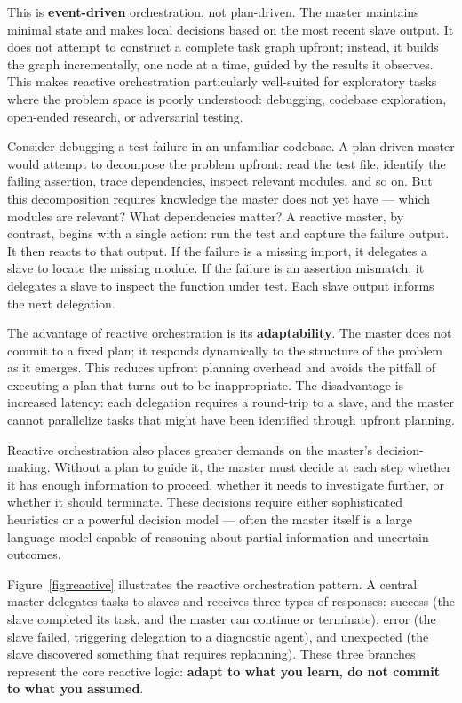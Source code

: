 This is \textbf{event-driven} orchestration, not plan-driven. The master maintains minimal state and makes local decisions based on the most recent slave output. It does not attempt to construct a complete task graph upfront; instead, it builds the graph incrementally, one node at a time, guided by the results it observes. This makes reactive orchestration particularly well-suited for exploratory tasks where the problem space is poorly understood: debugging, codebase exploration, open-ended research, or adversarial testing.

Consider debugging a test failure in an unfamiliar codebase. A plan-driven master would attempt to decompose the problem upfront: read the test file, identify the failing assertion, trace dependencies, inspect relevant modules, and so on. But this decomposition requires knowledge the master does not yet have — which modules are relevant? What dependencies matter? A reactive master, by contrast, begins with a single action: run the test and capture the failure output. It then reacts to that output. If the failure is a missing import, it delegates a slave to locate the missing module. If the failure is an assertion mismatch, it delegates a slave to inspect the function under test. Each slave output informs the next delegation.

The advantage of reactive orchestration is its \textbf{adaptability}. The master does not commit to a fixed plan; it responds dynamically to the structure of the problem as it emerges. This reduces upfront planning overhead and avoids the pitfall of executing a plan that turns out to be inappropriate. The disadvantage is increased latency: each delegation requires a round-trip to a slave, and the master cannot parallelize tasks that might have been identified through upfront planning.

Reactive orchestration also places greater demands on the master's decision-making. Without a plan to guide it, the master must decide at each step whether it has enough information to proceed, whether it needs to investigate further, or whether it should terminate. These decisions require either sophisticated heuristics or a powerful decision model — often the master itself is a large language model capable of reasoning about partial information and uncertain outcomes.

Figure~\ref{fig:reactive} illustrates the reactive orchestration pattern. A central master delegates tasks to slaves and receives three types of responses: success (the slave completed its task, and the master can continue or terminate), error (the slave failed, triggering delegation to a diagnostic agent), and unexpected (the slave discovered something that requires replanning). These three branches represent the core reactive logic: \textbf{adapt to what you learn, do not commit to what you assumed}.

